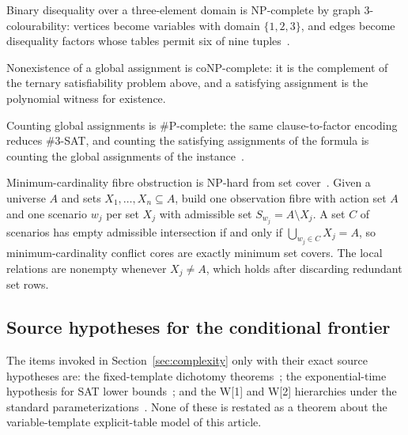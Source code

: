 \documentclass[11pt]{article}
\theoremstyle{plain}
\theoremstyle{definition}
\theoremstyle{remark}
\begin{document}
Binary disequality over a three-element domain is NP-complete by graph
3-colourability: vertices become variables with domain \(\{1,2,3\}\), and
edges become disequality factors whose tables permit six of nine
tuples~\cite{gareyjohnson79}.

Nonexistence of a global assignment is coNP-complete: it is the complement
of the ternary satisfiability problem above, and a satisfying assignment is
the polynomial witness for existence.

Counting global assignments is \#P-complete: the same clause-to-factor
encoding reduces \#3-SAT, and counting the satisfying assignments of the
formula is counting the global assignments of the
instance~\cite{valiant79,creignou-hermann96}.

Minimum-cardinality fibre obstruction is NP-hard from set
cover~\cite{karp72}.  Given a universe \(A\) and sets \(X_1,\dots,X_n
\subseteq A\), build one observation fibre with action set \(A\) and one
scenario \(w_j\) per set \(X_j\) with admissible set \(S_{w_j}=A\setminus
X_j\).  A set \(C\) of scenarios has empty admissible intersection if and
only if \(\bigcup_{w_j\in C}X_j=A\), so minimum-cardinality conflict cores
are exactly minimum set covers.  The local relations are nonempty whenever
\(X_j\ne A\), which holds after discarding redundant set rows.

\subsection{Source hypotheses for the conditional frontier}

The items invoked in Section~\ref{sec:complexity} only with their exact
source hypotheses are: the fixed-template dichotomy
theorems~\cite{schaefer78,zhuk17}; the exponential-time hypothesis for SAT
lower bounds~\cite{impagliazzo-paturi01}; and the W[1] and W[2] hierarchies
under the standard parameterizations~\cite{downey-fellows99}.  None of these
is restated as a theorem about the variable-template explicit-table model of
this article.
\end{document}
